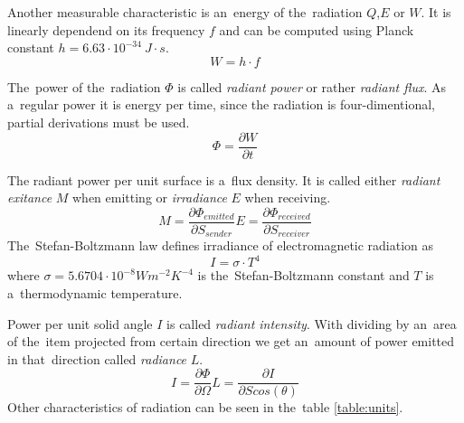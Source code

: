 Another measurable characteristic is an~energy of the~radiation $Q$,$E$ or $W$. It is linearly dependend
on its frequency $f$ and can be computed using Planck constant $h=6.63\cdot10^{-34}~J\cdot s $.
\cite{NasaEMSpectrum}
\begin{equation}
W = h\cdot f
\end{equation}

The~power of the~radiation $\Phi$ is called {\it radiant power} or rather {\it radiant flux}. As a~regular
power it is energy per time, since the radiation is four-dimentional, partial derivations must be used.
\begin{equation}
\Phi = \frac{\partial W}{\partial t}
\end{equation}

The radiant power per unit surface is a~flux density. It is called either {\it radiant exitance} $M$
when emitting or {\it irradiance} $E$ when receiving.
\begin{subequations}
\begin{equation}
M = \frac{\partial \Phi_{emitted}}{\partial S_{sender}}
\end{equation}
\begin{equation}
E = \frac{\partial \Phi_{received}}{\partial S_{receiver}}
\end{equation}
\end{subequations}
The~Stefan-Boltzmann law defines irradiance of electromagnetic radiation as
\begin{equation}
I = \sigma \cdot T^4
\end{equation}
where $\sigma = 5.6704\cdot 10^{-8} Wm^{-2}K^{-4}$ is the~Stefan-Boltzmann constant and $T$ is a~thermodynamic
temperature.

Power per unit solid angle $I$ is called {\it radiant intensity}. With dividing by an~area of the~item
projected from certain direction we get an~amount of power emitted in that~direction called {\it radiance} $L$.
\begin{subequations}
\begin{equation}
I = \frac{\partial \Phi}{\partial \Omega}
\end{equation}
\begin{equation}
L = \frac{\partial I}{\partial S cos(\theta)}
\end{equation}
\end{subequations}
Other characteristics of radiation can be seen in the~table \ref{table:units}. \cite{iso800007} \cite{TemperatureMeasuring}

